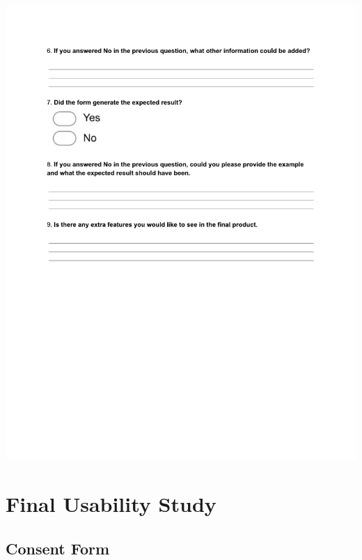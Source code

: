 \newpage
\begin{centering}
\includegraphics[trim = 40 160 0 60,scale=0.9]{forms/prototypeEvaluationFormPage2.pdf}
\end{centering}

\chapter{Final Usability Study} \label{chp:finalUsabilityStudy}

\newpage
\section{Consent Form}
\vspace{3em}


